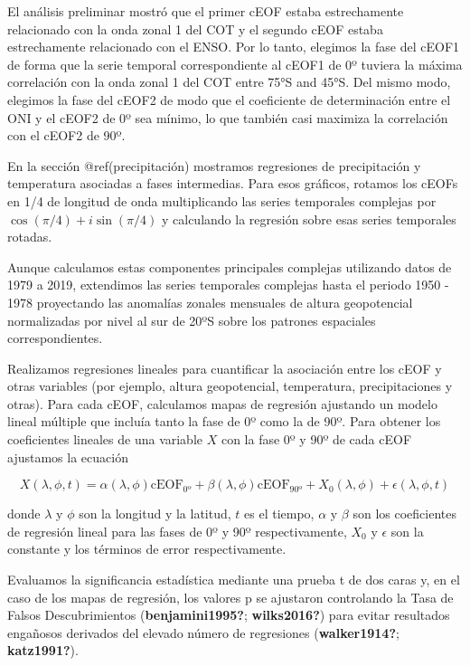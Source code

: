 \documentclass[12pt,oneside]{reedthesis}
\begin{document}
El análisis preliminar mostró que el primer cEOF estaba estrechamente relacionado con la onda zonal 1 del COT y el segundo cEOF estaba estrechamente relacionado con el ENSO.
Por lo tanto, elegimos la fase del cEOF1 de forma que la serie temporal correspondiente al cEOF1 de 0º tuviera la máxima correlación con la onda zonal 1 del COT entre 75°S and 45°S.
Del mismo modo, elegimos la fase del cEOF2 de modo que el coeficiente de determinación entre el ONI y el cEOF2 de 0º sea mínimo, lo que también casi maximiza la correlación con el cEOF2 de 90º.

En la sección @ref(precipitación) mostramos regresiones de precipitación y temperatura asociadas a fases intermedias.
Para esos gráficos, rotamos los cEOFs en 1/4 de longitud de onda multiplicando las series temporales complejas por \(\cos(\pi/4) + i\sin(\pi/4)\) y calculando la regresión sobre esas series temporales rotadas.

Aunque calculamos estas componentes principales complejas utilizando datos de 1979 a 2019, extendimos las series temporales complejas hasta el periodo 1950 - 1978 proyectando las anomalías zonales mensuales de altura geopotencial normalizadas por nivel al sur de 20ºS sobre los patrones espaciales correspondientes.

Realizamos regresiones lineales para cuantificar la asociación entre los cEOF y otras variables (por ejemplo, altura geopotencial, temperatura, precipitaciones y otras).
Para cada cEOF, calculamos mapas de regresión ajustando un modelo lineal múltiple que incluía tanto la fase de 0º como la de 90º.
Para obtener los coeficientes lineales de una variable \(X\) con la fase 0º y 90º de cada cEOF ajustamos la ecuación

\[
X(\lambda, \phi, t) = \alpha(\lambda, \phi) \operatorname{cEOF_{0º}} + \beta(\lambda, \phi) \operatorname{cEOF_{90º}} + X_0(\lambda, \phi) + \epsilon(\lambda, \phi, t)
\]

donde \(\lambda\) y \(\phi\) son la longitud y la latitud, \(t\) es el tiempo, \(\alpha\) y \(\beta\) son los coeficientes de regresión lineal para las fases de 0º y 90º respectivamente, \(X_0\) y \(\epsilon\) son la constante y los términos de error respectivamente.

Evaluamos la significancia estadística mediante una prueba t de dos caras y, en el caso de los mapas de regresión, los valores p se ajustaron controlando la Tasa de Falsos Descubrimientos (\textbf{benjamini1995?}; \textbf{wilks2016?}) para evitar resultados engañosos derivados del elevado número de regresiones (\textbf{walker1914?}; \textbf{katz1991?}).
\end{document}
